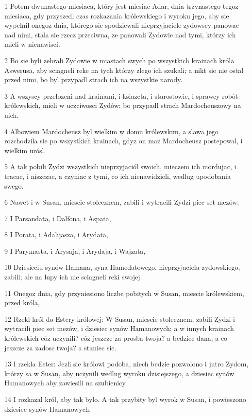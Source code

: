 \par 1 Potem dwunastego miesiaca, który jest miesiac Adar, dnia trzynastego tegoz miesiaca, gdy przyszedl czas rozkazania królewskiego i wyroku jego, aby sie wypelnil onegoz dnia, którego sie spodziewali nieprzyjaciele zydowscy panowac nad nimi, stala sie rzecz przeciwna, ze panowali Zydowie nad tymi, którzy ich mieli w nienawisci.
\par 2 Bo sie byli zebrali Zydowie w miastach swych po wszystkich krainach króla Aswerusa, aby sciagneli reke na tych którzy zlego ich szukali; a nikt sie nie ostal przed nimi, bo byl przypadl strach ich na wszystkie narody.
\par 3 A wszyscy przelozeni nad krainami, i ksiazeta, i starostowie, i sprawcy robót królewskich, mieli w uczciwosci Zydów; bo przypadl strach Mardocheuszowy na nich.
\par 4 Albowiem Mardocheusz byl wielkim w domu królewskim, a slawa jego rozchodzila sie po wszystkich krainach, gdyz on maz Mardocheusz postepowal, i wielkim urósl.
\par 5 A tak pobili Zydzi wszystkich nieprzyjaciól swoich, mieczem ich mordujac, i tracac, i niszczac, a czyniac z tymi, co ich nienawidzieli, wedlug upodobania swego.
\par 6 Nawet i w Susan, miescie stolecznem, zabili i wytracili Zydzi piec set mezów;
\par 7 I Parsandata, i Dalfona, i Aspata,
\par 8 I Porata, i Adalijasza, i Arydata,
\par 9 I Parymasta, i Arysaja, i Arydaja, i Wajzata,
\par 10 Dziesieciu synów Hamana, syna Hamedatowego, nieprzyjaciela zydowskiego, zabili; ale na lupy ich nie sciagneli reki swojej.
\par 11 Onegoz dnia, gdy przyniesiono liczbe pobitych w Susan, miescie królewskiem, przed króla,
\par 12 Rzekl król do Estery królowej: W Susan, miescie stolecznem, zabili Zydzi i wytracili piec set mezów, i dziesiec synów Hamanowych; a w innych krainach królewskich cóz uczynili? cóz jeszcze za prosba twoja? a bedziec dana; a co jeszcze za zadosc twoja? a staniec sie.
\par 13 I rzekla Ester: Jezli sie królowi podoba, niech bedzie pozwolono i jutro Zydom, którzy sa w Susan, aby uczynili wedlug wyroku dzisiejszego, a dziesiec synów Hamanowych aby zawiesili na szubienicy.
\par 14 I rozkazal król, aby tak bylo. A tak przybity byl wyrok w Susan, i powieszono dziesiec synów Hamanowych.
